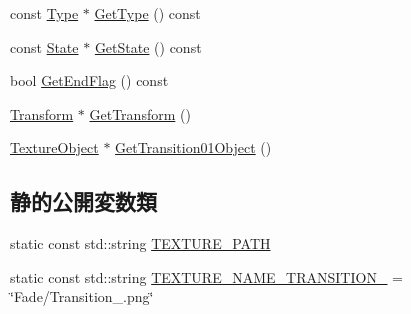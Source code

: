\begin{DoxyCompactItemize}
\item 
const \mbox{\hyperlink{class_fade_ac06f27215b454aa05b93c236476d6e80}{Type}} $\ast$ \mbox{\hyperlink{class_fade_aed5a29d39a5fd6161a9aed73d5f30870}{Get\+Type}} () const
\item 
const \mbox{\hyperlink{class_fade_ae77826bf3ff2ab95fb7b3b6f95cba80a}{State}} $\ast$ \mbox{\hyperlink{class_fade_aeb41dfcadf75dd4c980da68e243cc310}{Get\+State}} () const
\item 
bool \mbox{\hyperlink{class_fade_acc8adf28ce2e4270e5fb3907d83dadd0}{Get\+End\+Flag}} () const
\item 
\mbox{\hyperlink{class_transform}{Transform}} $\ast$ \mbox{\hyperlink{class_fade_a1a177209e72a27858ceb2d339321e9c4}{Get\+Transform}} ()
\item 
\mbox{\hyperlink{class_texture_object}{Texture\+Object}} $\ast$ \mbox{\hyperlink{class_fade_a4e047c532d430095e7d0d70288289a82}{Get\+Transition01\+Object}} ()
\end{DoxyCompactItemize}
\subsection*{静的公開変数類}
\begin{DoxyCompactItemize}
\item 
static const std\+::string \mbox{\hyperlink{class_fade_acd9c0d6231180af183d6301f31fa0053}{T\+E\+X\+T\+U\+R\+E\+\_\+\+P\+A\+TH}}
\item 
static const std\+::string \mbox{\hyperlink{class_fade_ab5d6f86f07e33205224fa486ff22c51d}{T\+E\+X\+T\+U\+R\+E\+\_\+\+N\+A\+M\+E\+\_\+\+T\+R\+A\+N\+S\+I\+T\+I\+O\+N\+\_}} = \char`\"{}Fade/Transition\+\_.\+png\char`\"{}
\end{DoxyCompactItemize}
